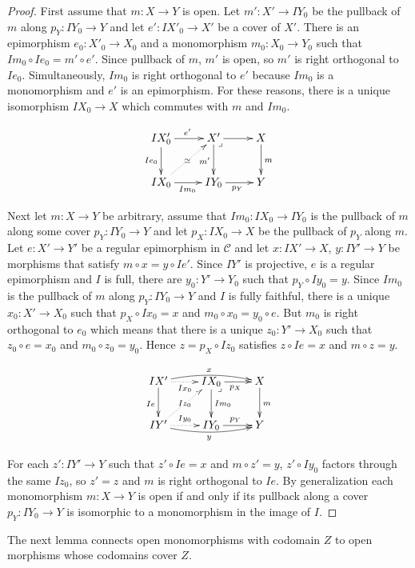 \documentclass[sort&compress]{elsarticle}
\theoremstyle{plain}
\theoremstyle{definition}
\theoremstyle{remark}
\newcommand\cat\mathcal
\begin{document}
\newcommand\pb{\ar@{}[dr]|<\lrcorner}

\begin{proof} First assume that $m:X\to Y$ is open. Let $m':X'\to IY_0$ be the pullback of $m$ along $p_Y:IY_0 \to Y$ and let $e':IX'_0 \to X'$ be a cover of $X'$. There is an epimorphism $e_0: X'_0 \to X_0$ and a monomorphism $m_0:X_0 \to Y_0$ such that $Im_0\circ Ie_0 = m'\circ e'$. Since pullback of $m$, $m'$ is open, so $m'$ is right orthogonal to $Ie_0$. Simultaneously, $Im_0$ is right orthogonal to $e'$ because $Im_0$ is a monomorphism and $e'$ is an epimorphism. For these reasons, there is a unique isomorphism $IX_0 \to X$ which commutes with $m$ and $Im_0$.

\[\xymatrix{
IX'_0 \ar[r]^{e'}\ar[d]_{Ie_0} & X'\ar[r]\ar[d]_{m'}\pb & X \ar[d]^m \\
IX_0 \ar[r]_{Im_0} \ar@{.>}[ur]|\simeq & IY_0\ar[r]_{p_Y} & Y
}\]

Next let $m:X\to Y$ be arbitrary, assume that $Im_0: IX_0 \to IY_0$ is the pullback of $m$ along some cover $p_Y:IY_0 \to Y$ and let $p_X:IX_0 \to X$ be the pullback of $p_Y$ along $m$. Let $e:X'\to Y'$ be a regular epimorphism in $\cat C$ and let $x:IX'\to X$, $y:IY'\to Y$ be morphisms that satisfy $m\circ x = y\circ Ie'$. Since $IY'$ is projective, $e$ is a regular epimorphism and $I$ is full, there are $y_0:Y'\to Y_0$ such that $p_Y\circ Iy_0 = y$. Since $Im_0$ is the pullback of $m$ along $p_Y:IY_0\to Y$ and $I$ is fully faithful, there is a unique $x_0:X'\to X_0$ such that $p_X\circ Ix_0 = x$ and $m_0\circ x_0 = y_0 \circ e$. But $m_0$ is right orthogonal to $e_0$ which means that there is a unique $z_0:Y'\to X_0$ such that $z_0\circ e = x_0$ and $m_0\circ z_0 = y_0$. Hence $z = p_X\circ Iz_0$ satisfies $z\circ Ie = x$ and $m\circ z = y$.

\[\xymatrix{
IX'\ar[d]_{Ie} \ar@{.>}[r]_{Ix_0}\ar@/^/[rr]^x & IX_0 \ar[d]^{Im_0} \ar[r]_{p_X} \pb & X \ar[d]^m\\ 
IY'\ar@{.>}[r]^{Iy_0} \ar@/_/[rr]_{y} \ar@{.>}[ur]|{Iz_0} & IY_0\ar[r]^{p_Y} & Y
}\]

For each $z': IY'\to Y$ such that $z'\circ Ie = x$ and $m\circ z' = y$, $z'\circ Iy_0$ factors through the same $Iz_0$, so $z' = z$ and $m$ is right orthogonal to $Ie$. By generalization each monomorphism $m:X\to Y$ is open if and only if its pullback along a cover $p_Y:IY_0 \to Y$ is isomorphic to a monomorphism in the image of $I$.
\end{proof}

The next lemma connects open monomorphisms with codomain $Z$ to open morphisms whose codomains cover $Z$.
\end{document}
